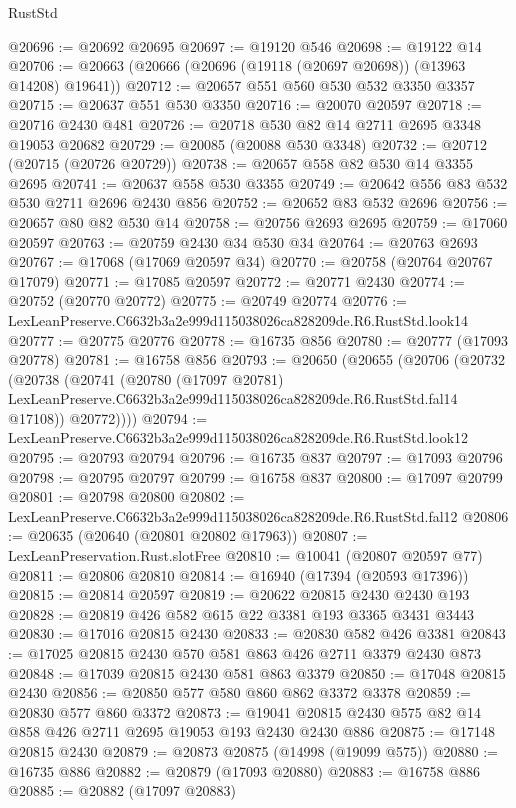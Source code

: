 \begin{lexlean}{RustStd}
\begin{coremodule}
@20696 := @20692 @20695
@20697 := @19120 @546
@20698 := @19122 @14
@20706 := @20663 (@20666 (@20696 (@19118 (@20697 @20698)) (@13963 @14208) @19641))
@20712 := @20657 @551 @560 @530 @532 @3350 @3357
@20715 := @20637 @551 @530 @3350
@20716 := @20070 @20597
@20718 := @20716 @2430 @481
@20726 := @20718 @530 @82 @14 @2711 @2695 @3348 @19053 @20682
@20729 := @20085 (@20088 @530 @3348)
@20732 := @20712 (@20715 (@20726 @20729))
@20738 := @20657 @558 @82 @530 @14 @3355 @2695
@20741 := @20637 @558 @530 @3355
@20749 := @20642 @556 @83 @532 @530 @2711 @2696 @2430 @856
@20752 := @20652 @83 @532 @2696
@20756 := @20657 @80 @82 @530 @14
@20758 := @20756 @2693 @2695
@20759 := @17060 @20597
@20763 := @20759 @2430 @34 @530 @34
@20764 := @20763 @2693
@20767 := @17068 (@17069 @20597 @34)
@20770 := @20758 (@20764 @20767 @17079)
@20771 := @17085 @20597
@20772 := @20771 @2430
@20774 := @20752 (@20770 @20772)
@20775 := @20749 @20774
@20776 := LexLeanPreserve.C6632b3a2e999d115038026ca828209de.R6.RustStd.look14
@20777 := @20775 @20776
@20778 := @16735 @856
@20780 := @20777 (@17093 @20778)
@20781 := @16758 @856
@20793 := @20650
    (@20655
      (@20706
        (@20732
          (@20738
            (@20741
              (@20780
                (@17097 @20781)
                LexLeanPreserve.C6632b3a2e999d115038026ca828209de.R6.RustStd.fal14
                @17108))
            @20772))))
@20794 := LexLeanPreserve.C6632b3a2e999d115038026ca828209de.R6.RustStd.look12
@20795 := @20793 @20794
@20796 := @16735 @837
@20797 := @17093 @20796
@20798 := @20795 @20797
@20799 := @16758 @837
@20800 := @17097 @20799
@20801 := @20798 @20800
@20802 := LexLeanPreserve.C6632b3a2e999d115038026ca828209de.R6.RustStd.fal12
@20806 := @20635 (@20640 (@20801 @20802 @17963))
@20807 := LexLeanPreservation.Rust.slotFree
@20810 := @10041 (@20807 @20597 @77)
@20811 := @20806 @20810
@20814 := @16940 (@17394 (@20593 @17396))
@20815 := @20814 @20597
@20819 := @20622 @20815 @2430 @2430 @193
@20828 := @20819 @426 @582 @615 @22 @3381 @193 @3365 @3431 @3443
@20830 := @17016 @20815 @2430
@20833 := @20830 @582 @426 @3381
@20843 := @17025 @20815 @2430 @570 @581 @863 @426 @2711 @3379 @2430 @873
@20848 := @17039 @20815 @2430 @581 @863 @3379
@20850 := @17048 @20815 @2430
@20856 := @20850 @577 @580 @860 @862 @3372 @3378
@20859 := @20830 @577 @860 @3372
@20873 := @19041 @20815 @2430 @575 @82 @14 @858 @426 @2711 @2695 @19053 @193 @2430 @2430 @886
@20875 := @17148 @20815 @2430
@20879 := @20873 @20875 (@14998 (@19099 @575))
@20880 := @16735 @886
@20882 := @20879 (@17093 @20880)
@20883 := @16758 @886
@20885 := @20882 (@17097 @20883)

\end{coremodule}
\end{lexlean}
